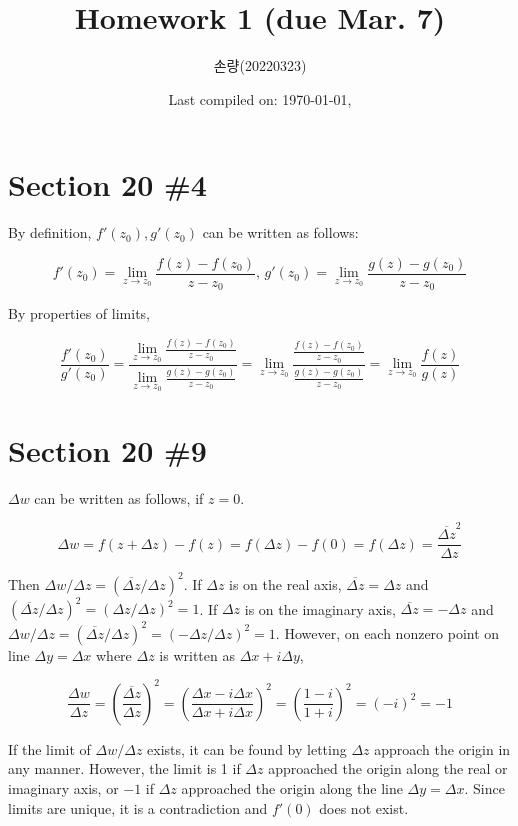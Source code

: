 \documentclass{scrartcl}
\title{Homework 1 (due Mar. 7)}
\author{손량(20220323)}
\date{Last compiled on: \today, \currenttime}
\begin{document}
\maketitle

\section{Section 20 \#4}
By definition, \(f'(z_0), g'(z_0)\) can be written as follows:

\[
  f'(z_0) = \lim_{z \to z_0} \frac{f(z) - f(z_0)}{z - z_0},\, g'(z_0) = \lim_{z \to z_0} \frac{g(z) - g(z_0)}{z - z_0}
\]

By properties of limits,

\[
  \frac{f'(z_0)}{g'(z_0)} = \frac{\lim_{z \to z_0} \frac{f(z) - f(z_0)}{z - z_0}}{\lim_{z \to z_0} \frac{g(z) - g(z_0)}{z - z_0}} = \lim_{z \to z_0} \frac{\frac{f(z) - f(z_0)}{z - z_0}}{\frac{g(z) - g(z_0)}{z - z_0}} = \lim_{z \to z_0} \frac{f(z)}{g(z)}
\]

\section{Section 20 \#9}
\(\Delta w\) can be written as follows, if \(z = 0\).

\[
  \Delta w = f(z + \Delta z) - f(z) = f(\Delta z) - f(0) = f(\Delta z) = \frac{\overline{\Delta z}^2}{\Delta z}
\]

Then \(\Delta w/\Delta z = \left(\overline{\Delta z} / \Delta z\right)^2\).
If \(\Delta z\) is on the real axis, \(\overline{\Delta z} = \Delta z\) and \(\left(\overline{\Delta z} / \Delta z\right)^2 = \left( \Delta z / \Delta z \right)^2 = 1\).
If \(\Delta z\) is on the imaginary axis, \(\overline{\Delta z} = -\Delta z\) and \(\Delta w / \Delta z = \left( \overline{\Delta z} / \Delta z \right)^2 = \left( -\Delta z / \Delta z \right)^2 = 1\).
However, on each nonzero point on line \(\Delta y = \Delta x\) where \(\Delta z\) is written as \(\Delta x + i\Delta y\),

\[
  \frac{\Delta w}{\Delta z} = \left( \frac{\overline{\Delta z}}{\Delta z} \right)^2 = \left( \frac{\Delta x - i\Delta x}{\Delta x + i\Delta x} \right)^2 = \left( \frac{1 - i}{1 + i} \right)^2 = (-i)^2 = -1
\]

If the limit of \(\Delta w / \Delta z\) exists, it can be found by letting \(\Delta z\) approach the origin in any manner.
However, the limit is 1 if \(\Delta z\) approached the origin along the real or imaginary axis, or \(-1\) if \(\Delta z\) approached the origin along the line \(\Delta y = \Delta x\).
Since limits are unique, it is a contradiction and \(f'(0)\) does not exist.
\end{document}
